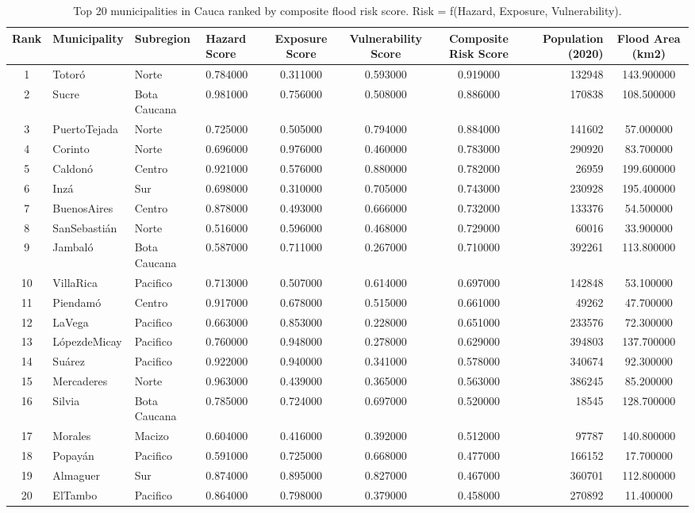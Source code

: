 \begin{table}[htbp]
\caption{Top 20 municipalities in Cauca ranked by composite flood risk score. Risk = f(Hazard, Exposure, Vulnerability).}
\label{tab:municipal_risk}
\begin{tabular}{clllcccrc}
\toprule
Rank & Municipality & Subregion & Hazard Score & Exposure Score & Vulnerability Score & Composite Risk Score & Population (2020) & Flood Area (km2) \\
\midrule
1 & Totoró & Norte & 0.784000 & 0.311000 & 0.593000 & 0.919000 & 132948 & 143.900000 \\
2 & Sucre & Bota Caucana & 0.981000 & 0.756000 & 0.508000 & 0.886000 & 170838 & 108.500000 \\
3 & PuertoTejada & Norte & 0.725000 & 0.505000 & 0.794000 & 0.884000 & 141602 & 57.000000 \\
4 & Corinto & Norte & 0.696000 & 0.976000 & 0.460000 & 0.783000 & 290920 & 83.700000 \\
5 & Caldonó & Centro & 0.921000 & 0.576000 & 0.880000 & 0.782000 & 26959 & 199.600000 \\
6 & Inzá & Sur & 0.698000 & 0.310000 & 0.705000 & 0.743000 & 230928 & 195.400000 \\
7 & BuenosAires & Centro & 0.878000 & 0.493000 & 0.666000 & 0.732000 & 133376 & 54.500000 \\
8 & SanSebastián & Norte & 0.516000 & 0.596000 & 0.468000 & 0.729000 & 60016 & 33.900000 \\
9 & Jambaló & Bota Caucana & 0.587000 & 0.711000 & 0.267000 & 0.710000 & 392261 & 113.800000 \\
10 & VillaRica & Pacifico & 0.713000 & 0.507000 & 0.614000 & 0.697000 & 142848 & 53.100000 \\
11 & Piendamó & Centro & 0.917000 & 0.678000 & 0.515000 & 0.661000 & 49262 & 47.700000 \\
12 & LaVega & Pacifico & 0.663000 & 0.853000 & 0.228000 & 0.651000 & 233576 & 72.300000 \\
13 & LópezdeMicay & Pacifico & 0.760000 & 0.948000 & 0.278000 & 0.629000 & 394803 & 137.700000 \\
14 & Suárez & Pacifico & 0.922000 & 0.940000 & 0.341000 & 0.578000 & 340674 & 92.300000 \\
15 & Mercaderes & Norte & 0.963000 & 0.439000 & 0.365000 & 0.563000 & 386245 & 85.200000 \\
16 & Silvia & Bota Caucana & 0.785000 & 0.724000 & 0.697000 & 0.520000 & 18545 & 128.700000 \\
17 & Morales & Macizo & 0.604000 & 0.416000 & 0.392000 & 0.512000 & 97787 & 140.800000 \\
18 & Popayán & Pacifico & 0.591000 & 0.725000 & 0.668000 & 0.477000 & 166152 & 17.700000 \\
19 & Almaguer & Sur & 0.874000 & 0.895000 & 0.827000 & 0.467000 & 360701 & 112.800000 \\
20 & ElTambo & Pacifico & 0.864000 & 0.798000 & 0.379000 & 0.458000 & 270892 & 11.400000 \\
\bottomrule
\end{tabular}
\end{table}
